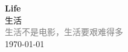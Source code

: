 \vspace*{\fill}
\begin{center}
    \textcolor{red!50}{\Huge\textbf{Life}} \\[1em]
    \textcolor{red!60!pink}{\Large 生活} \\[2em]
    \textcolor{gray}{\large 生活不是电影，生活要艰难得多} \\[1em]
    \today
\end{center}
\vspace*{\fill}
\clearpage


\clearpage

\clearpage

\clearpage

\clearpage




